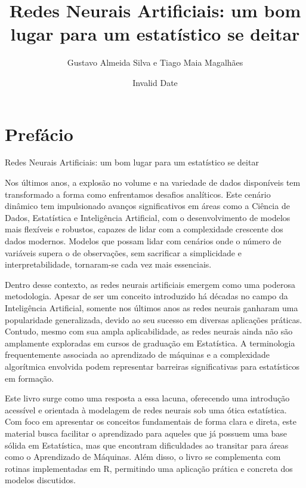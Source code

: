 \documentclass[
  letterpaper,
  DIV=11,
  numbers=noendperiod]{scrreprt}
\title{Redes Neurais Artificiais: um bom lugar para um estatístico se
deitar}
\author{Gustavo Almeida Silva e Tiago Maia Magalhães}
\date{Invalid Date}
\renewcommand*\contentsname{Table of contents}
\newcommand\contentsname{Table of contents}
\begin{document}
\maketitle
\ifdefined\Shaded\renewenvironment{Shaded}{\begin{tcolorbox}[enhanced, breakable, boxrule=0pt, interior hidden, frame hidden, borderline west={3pt}{0pt}{shadecolor}, sharp corners]}{\end{tcolorbox}}\fi

\renewcommand*\contentsname{Table of contents}
{
\hypersetup{linkcolor=}
\setcounter{tocdepth}{2}
\tableofcontents
}

\hypertarget{prefuxe1cio}{%
\chapter*{Prefácio}\label{prefuxe1cio}}


Redes Neurais Artificiais: um bom lugar para um estatístico se deitar

Nos últimos anos, a explosão no volume e na variedade de dados
disponíveis tem transformado a forma como enfrentamos desafios
analíticos. Este cenário dinâmico tem impulsionado avanços
significativos em áreas como a Ciência de Dados, Estatística e
Inteligência Artificial, com o desenvolvimento de modelos mais flexíveis
e robustos, capazes de lidar com a complexidade crescente dos dados
modernos. Modelos que possam lidar com cenários onde o número de
variáveis supera o de observações, sem sacrificar a simplicidade e
interpretabilidade, tornaram-se cada vez mais essenciais.

Dentro desse contexto, as redes neurais artificiais emergem como uma
poderosa metodologia. Apesar de ser um conceito introduzido há décadas
no campo da Inteligência Artificial, somente nos últimos anos as redes
neurais ganharam uma popularidade generalizada, devido ao seu sucesso em
diversas aplicações práticas. Contudo, mesmo com sua ampla
aplicabilidade, as redes neurais ainda não são amplamente exploradas em
cursos de graduação em Estatística. A terminologia frequentemente
associada ao aprendizado de máquinas e a complexidade algorítmica
envolvida podem representar barreiras significativas para estatísticos
em formação.

Este livro surge como uma resposta a essa lacuna, oferecendo uma
introdução acessível e orientada à modelagem de redes neurais sob uma
ótica estatística. Com foco em apresentar os conceitos fundamentais de
forma clara e direta, este material busca facilitar o aprendizado para
aqueles que já possuem uma base sólida em Estatística, mas que encontram
dificuldades ao transitar para áreas como o Aprendizado de Máquinas.
Além disso, o livro se complementa com rotinas implementadas em R,
permitindo uma aplicação prática e concreta dos modelos discutidos.
\end{document}
